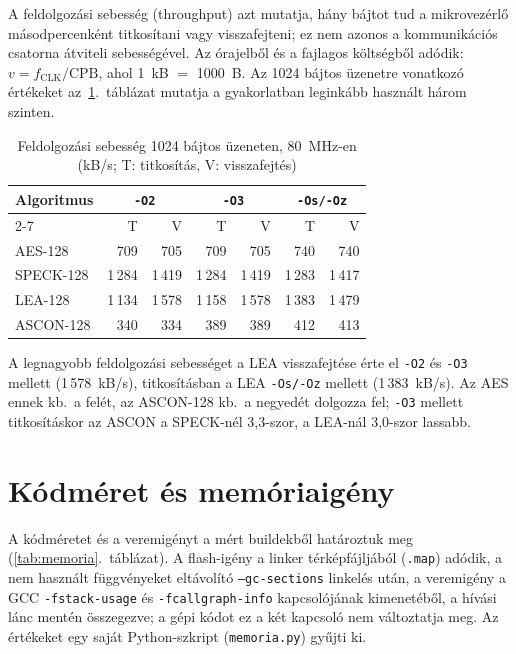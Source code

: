 \documentclass[a4paper,12pt]{report}
\theoremstyle{definition}
\theoremstyle{remark}
\begin{document}
A feldolgozási sebesség (throughput) azt mutatja, hány bájtot tud a mikrovezérlő másodpercenként titkosítani vagy visszafejteni; ez nem azonos a kommunikációs csatorna átviteli sebességével. Az órajelből és a fajlagos költségből adódik: $v = f_{\mathrm{CLK}}/\mathrm{CPB}$, ahol 1~kB $=$ 1000~B. Az 1024 bájtos üzenetre vonatkozó értékeket az~\ref{tab:throughput}.~táblázat mutatja a gyakorlatban leginkább használt három szinten.

\begin{table}[htbp]
    \centering
    \small
    \caption{Feldolgozási sebesség 1024 bájtos üzeneten, 80~MHz-en (kB/s; T: titkosítás, V: visszafejtés)}
    \label{tab:throughput}
    \begin{tabular}{|l|r|r|r|r|r|r|}
        \hline
        \textbf{Algoritmus} & \multicolumn{2}{c|}{\textbf{\texttt{-O2}}} & \multicolumn{2}{c|}{\textbf{\texttt{-O3}}} & \multicolumn{2}{c|}{\textbf{\texttt{-Os/-Oz}}} \\ \cline{2-7}
        & T & V & T & V & T & V \\ \hline
        AES-128       & 709    & 705    & 709    & 705    & 740    & 740    \\ \hline
        SPECK-128     & 1\,284 & 1\,419 & 1\,284 & 1\,419 & 1\,283 & 1\,417 \\ \hline
        LEA-128       & 1\,134 & 1\,578 & 1\,158 & 1\,578 & 1\,383 & 1\,479 \\ \hline
        ASCON-128     & 340    & 334    & 389    & 389    & 412    & 413    \\ \hline
    \end{tabular}
\end{table}

A legnagyobb feldolgozási sebességet a LEA visszafejtése érte el \texttt{-O2} és \texttt{-O3} mellett (1\,578~kB/s), titkosításban a LEA \texttt{-Os/-Oz} mellett (1\,383~kB/s). Az AES ennek kb.\ a felét, az ASCON-128 kb.\ a negyedét dolgozza fel; \texttt{-O3} mellett titkosításkor az ASCON a SPECK-nél 3,3-szor, a LEA-nál 3,0-szor lassabb.

\section{Kódméret és memóriaigény}\label{sec:memoria}

A kódméretet és a veremigényt a mért buildekből határoztuk meg (\ref{tab:memoria}.~táblázat). A flash-igény a linker térképfájljából (\texttt{.map}) adódik, a nem használt függvényeket eltávolító \texttt{--gc-sections} linkelés után, a veremigény a GCC \texttt{-fstack-usage} és \texttt{-fcallgraph-info} kapcsolójának kimenetéből, a hívási lánc mentén összegezve; a gépi kódot ez a két kapcsoló nem változtatja meg. Az értékeket egy saját Python-szkript (\texttt{memoria.py}) gyűjti ki.
\end{document}
